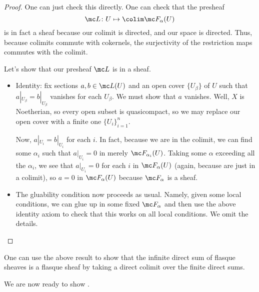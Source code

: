 \documentclass[../notes.tex]{subfiles}
\begin{document}
\begin{proof}
	One can just check this directly. One can check that the presheaf
	\[\mc L\colon U\mapsto\colim\mc F_\alpha(U)\]
	is in fact a sheaf because our colimit is directed, and our space is directed. Thus, because colimits commute with cokernels, the surjectivity of the restriction maps commutes with the colimit.

	Let's show that our presheaf $\mc L$ is in a sheaf.
	\begin{itemize}
		\item Identity: fix sections $a,b\in\mc L(U)$ and an open cover $\{U_\beta\}$ of $U$ such that $a|_{U_\beta}=b|_{U_\beta}$ vanishes for each $U_\beta$. We must show that $a$ vanishes. Well, $X$ is Noetherian, so every open subset is quasicompact, so we may replace our open cover with a finite one $\{U_i\}_{i=1}^n$.

		Now, $a|_{U_i}=b|_{U_i}$ for each $i$. In fact, because we are in the colimit, we can find some $\alpha_i$ such that $a|_{U_i}=0$ in merely $\mc F_{\alpha_i}(U)$. Taking some $\alpha$ exceeding all the $\alpha_i$, we see that $a|_{U_i}=0$ for each $i$ in $\mc F_\alpha(U)$ (again, because are just in a colimit), so $a=0$ in $\mc F_\alpha(U)$ because $\mc F_\alpha$ is a sheaf.
		\item The gluability condition now proceeds as usual. Namely, given some local conditions, we can glue up in some fixed $\mc F_\alpha$ and then use the above identity axiom to check that this works on all local conditions. We omit the details.
		\qedhere
	\end{itemize}
\end{proof}
\begin{remark}
	One can use the above result to show that the infinite direct sum of flasque sheaves is a flasque sheaf by taking a direct colimit over the finite direct sums.
\end{remark}
We are now ready to show .
\end{document}
